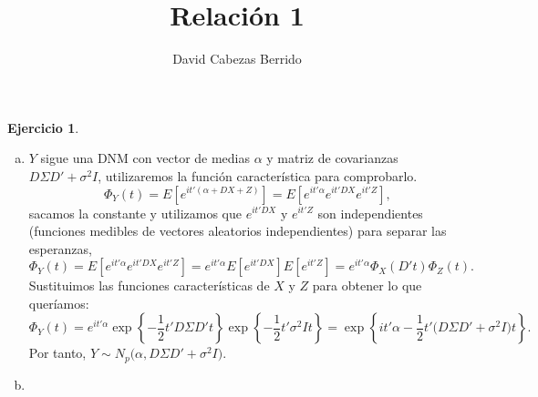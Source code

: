 \documentclass[12pt,spanish]{article}
\title{Relación 1}
\author{David Cabezas Berrido}
\date{}
\theoremstyle{definition}
\newtheorem{exercise}{Ejercicio}
\begin{document}
\maketitle

\begin{exercise} ~
  \begin{enumerate}[a)]
  \item $Y$ sigue una DNM con vector de medias $\alpha$ y matriz de
    covarianzas $D\Sigma D'+\sigma^2 I$, utilizaremos la función
    característica para comprobarlo.
    \[\Phi_Y(t)=E[e^{it'(\alpha+DX+Z)}]=E[e^{it'\alpha}e^{it'DX}e^{it'Z}],\]
    sacamos la constante y utilizamos que $e^{it'DX}$ y $e^{it'Z}$ son
    independientes (funciones medibles de vectores aleatorios
    independientes) para separar las esperanzas,
    \[\Phi_Y(t)=E[e^{it'\alpha}e^{it'DX}e^{it'Z}]=e^{it'\alpha}E[e^{it'DX}]E[e^{it'Z}]=e^{it'\alpha}\Phi_X(D't)\Phi_Z(t).\]
    Sustituimos las funciones características de $X$ y $Z$ para
    obtener lo que queríamos:
    \[\Phi_Y(t)=e^{it'\alpha}\exp\left\{-\frac{1}{2}t'D\Sigma
        D't\right\}\exp\left\{-\frac{1}{2}t'\sigma^2 I
        t\right\}=\exp\left\{it'\alpha -\frac{1}{2}t'\big(D\Sigma
        D'+\sigma^2I\big)t\right\}.\] Por tanto,
    $Y\sim N_p\big(\alpha,D\Sigma D'+\sigma^2I\big)$.
  \item 
  \end{enumerate}
\end{exercise}
\end{document}

